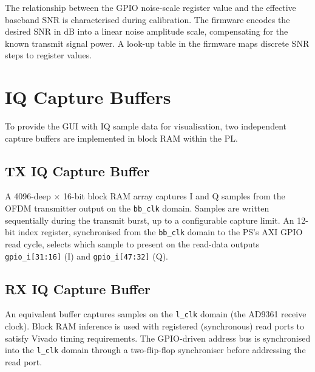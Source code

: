 \documentclass[12pt, a4paper, oneside]{report}
\begin{document}
The relationship between the GPIO noise-scale register value and the effective baseband SNR is characterised during calibration. The firmware encodes the desired SNR in dB into a linear noise amplitude scale, compensating for the known transmit signal power. A look-up table in the firmware maps discrete SNR steps to register values.

\section{IQ Capture Buffers}

To provide the GUI with IQ sample data for visualisation, two independent capture buffers are implemented in block RAM within the PL.

\subsection{TX IQ Capture Buffer}

A 4096-deep $\times$ 16-bit block RAM array captures I and Q samples from the OFDM transmitter output on the \texttt{bb\_clk} domain. Samples are written sequentially during the transmit burst, up to a configurable capture limit. An 12-bit index register, synchronised from the \texttt{bb\_clk} domain to the PS's AXI GPIO read cycle, selects which sample to present on the read-data outputs \texttt{gpio\_i[31:16]} (I) and \texttt{gpio\_i[47:32]} (Q).

\subsection{RX IQ Capture Buffer}

An equivalent buffer captures samples on the \texttt{l\_clk} domain (the AD9361 receive clock). Block RAM inference is used with registered (synchronous) read ports to satisfy Vivado timing requirements. The GPIO-driven address bus is synchronised into the \texttt{l\_clk} domain through a two-flip-flop synchroniser before addressing the read port.
\end{document}
